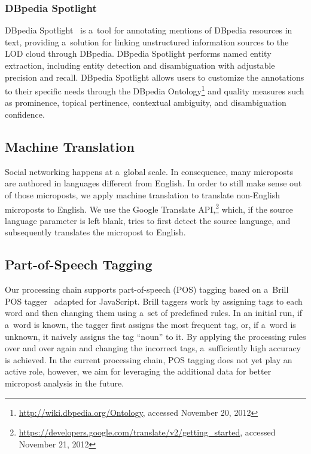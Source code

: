\subsubsection{DBpedia Spotlight}

DBpedia Spotlight~\cite{mendes2011dbpediaspotlight}
is a~tool for annotating mentions of DBpedia resources in text,
providing a~solution for linking unstructured information sources
to the LOD cloud through DBpedia.
DBpedia Spotlight performs named entity extraction,
including entity detection and disambiguation
with adjustable precision and recall.
DBpedia Spotlight allows users to customize the annotations
to their specific needs through the DBpedia
Ontology\footnote{\url{http://wiki.dbpedia.org/Ontology},
accessed November 20, 2012}
and quality measures such as prominence, topical pertinence,
contextual ambiguity, and disambiguation confidence.

\subsection{Machine Translation}
\label{sec:machine-translation}

Social networking happens at a~global scale.
In consequence, many microposts are authored
in languages different from English.
In order to still make sense out of those microposts,
we apply machine translation to translate non-English microposts
to English.
We use the Google Translate
API,\footnote{\url{https://developers.google.com/translate/v2/getting_started},
accessed November 21, 2012}
which, if the source language parameter is left blank,
tries to first detect the source language,
and subsequently translates the micropost to English.

\subsection{Part-of-Speech Tagging}
\label{sec:part-of-speech-tagging}

Our processing chain supports part-of-speech (POS) tagging
based on a~Brill POS tagger~\cite{brill1992pos} adapted for JavaScript.
Brill taggers work by assigning tags to each word and then changing them
using a~set of predefined rules.
In an initial run, if a~word is known, the tagger
first assigns the most frequent tag,
or, if a~word is unknown, it naively assigns the tag ``noun'' to it.
By applying the processing rules over and over again and
changing the incorrect tags, a~sufficiently high accuracy is achieved.
In the current processing chain, POS tagging does not yet
play an active role,
however, we aim for leveraging the additional data
for better micropost analysis in the future.

